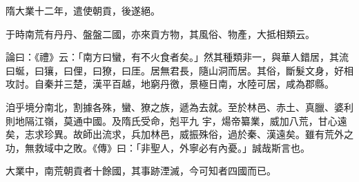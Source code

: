 \begin{pinyinscope}
 隋大業十二年，遣使朝貢，後遂絕。



 于時南荒有丹丹、盤盤二國，亦來貢方物，其風俗、物產，大抵相類云。



 論曰：《禮》云：「南方曰蠻，有不火食者矣。」然其種類非一，與華人錯居，其流曰蜒，曰獽，曰俚，曰獠，曰厓。居無君長，隨山洞而居。其俗，斷髮文身，好相攻討。自秦并三楚，漢平百越，地窮丹徼，景極日南，水陸可居，咸為郡縣。



 洎乎境分南北，割據各殊，蠻、獠之族，遞為去就。至於林邑、赤土、真臘、婆利則地隔江嶺，莫通中國。及隋氏受命，剋平九
 宇，煬帝纂業，威加八荒，甘心遠矣，志求珍異。故師出流求，兵加林邑，威振殊俗，過於秦、漢遠矣。雖有荒外之功，無救域中之敗。《傳》曰：「非聖人，外寧必有內憂。」誠哉斯言也。



 大業中，南荒朝貢者十餘國，其事跡湮滅，今可知者四國而已。



\end{pinyinscope}